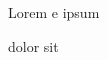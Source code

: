\documentclass{article}
\begin{document}
Lorem
\gls{e}
ipsum

dolor
\printglossary
sit
\end{document}
